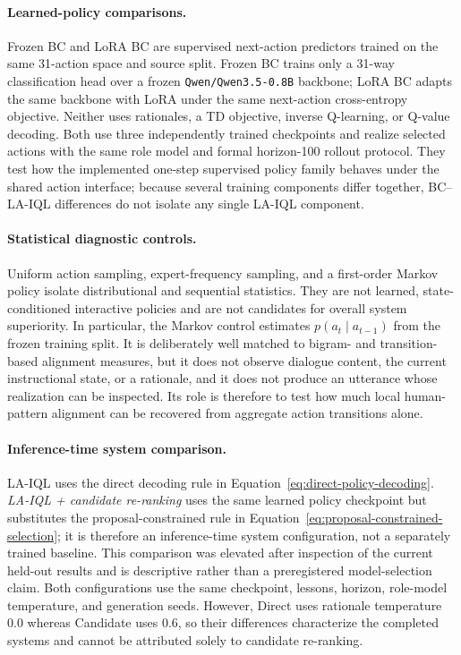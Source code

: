 \documentclass[manuscript,review,anonymous]{acmart}
\begin{document}
\paragraph{Learned-policy comparisons.}
Frozen BC and LoRA BC are supervised next-action predictors trained on the same
31-action space and source split. Frozen BC trains only a 31-way classification
head over a frozen \texttt{Qwen/Qwen3.5-0.8B} backbone; LoRA BC adapts the same
backbone with LoRA under the same next-action cross-entropy objective. Neither
uses rationales, a TD objective, inverse Q-learning, or Q-value decoding. Both
use three independently trained checkpoints and realize selected actions with
the same role model and formal horizon-100 rollout protocol. They test how the
implemented one-step supervised policy family behaves under the shared action
interface; because several training components differ together, BC--LA-IQL
differences do not isolate any single LA-IQL component.

\paragraph{Statistical diagnostic controls.}
Uniform action sampling, expert-frequency sampling, and a first-order Markov
policy isolate distributional and sequential statistics. They are not learned,
state-conditioned interactive policies and are not candidates for overall
system superiority. In particular, the Markov control estimates
$p(a_t\mid a_{t-1})$ from the frozen training split. It is deliberately well
matched to bigram- and transition-based alignment measures, but it does not observe
dialogue content, the current instructional state, or a rationale, and it
does not produce an utterance whose realization can be inspected. Its role is
therefore to test how much local human-pattern alignment can be recovered from
aggregate action transitions alone.

\paragraph{Inference-time system comparison.}
LA-IQL uses the direct decoding rule in
Equation~\ref{eq:direct-policy-decoding}. \emph{LA-IQL + candidate re-ranking}
uses the same learned policy checkpoint but substitutes the proposal-constrained
rule in Equation~\ref{eq:proposal-constrained-selection}; it is therefore an
inference-time system configuration, not a separately trained baseline. This
comparison was elevated after inspection of the current held-out results and is
descriptive rather than a preregistered model-selection claim. Both
configurations use the same checkpoint, lessons, horizon, role-model
temperature, and generation seeds. However, Direct uses rationale temperature
0.0 whereas Candidate uses 0.6, so their differences characterize the completed
systems and cannot be attributed solely to candidate re-ranking.
\end{document}

